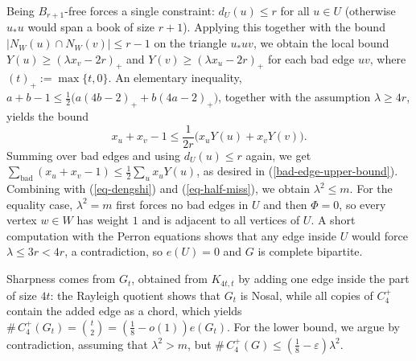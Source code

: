 \documentclass[10pt,a4paper]{amsart}
\renewcommand{\le}{\leqslant}
\renewcommand{\ge}{\geqslant}
\begin{document}
\smallskip
\noindent
{}
Being $B_{r+1}$-free forces a single constraint:  $d_U(u)\le r$ for all $u\in U$
(otherwise $u_*u$ would span a book of size $r+1$). Applying this together with the bound
$|N_W(u)\cap N_W(v)|\le r-1$ on the triangle $u_*uv$, we obtain the local 
bound $Y(u)\ge(\lambda x_v-2r)_+$ and 
$ Y(v)\ge (\lambda x_u -2r)_+$ for each bad edge $uv$, where  $(t)_+:=\max\{t,0\}$. 
An elementary inequality, 
$a+b-1\le\tfrac12\bigl(a(4b-2)_++b(4a-2)_+\bigr)$, together with the assumption $\lambda\ge 4r$,  yields the  bound
$$ x_u+x_v-1\le\frac1{2r}\bigl(x_uY(u)+x_vY(v)\bigr). $$  Summing over bad edges and
using $d_U (u)\le r$ again, we get 
$\sum_{\text{bad}} (x_u+x_v -1) \le  \tfrac12\sum_{u}x_uY(u)$, as desired in (\ref{bad-edge-upper-bound}). Combining with (\ref{eq-dengshi}) and (\ref{eq-half-miss}), 
we obtain $\lambda ^2\le m$. For the equality case, $\lambda^2=m$ first forces no bad edges in $U$ and then $\Phi=0$, so every vertex $w\in W$ has weight $1$ and
is adjacent to all vertices of $U$. A short computation with the Perron equations shows that any
edge inside $U$ would force $\lambda\le 3r<4r$, a contradiction, so $e(U)=0$ and
$G$ is complete bipartite.

\smallskip
\noindent
{}
Sharpness comes from $G_t$, obtained from $K_{4t,t}$ by adding one
edge inside the part of size $4t$: the Rayleigh quotient shows that $G_t$ is Nosal, while all copies of $C_4^+$ contain the added edge as a chord, which yields 
$\texttt{\#}\,C_4^+(G_t)=\binom t2=(\tfrac18-o(1))e(G_t)$. For the lower bound, we argue by
contradiction, assuming that $\lambda^2>m$, but 
$\texttt{\#}\, C_4^+(G)\le(\tfrac18-\varepsilon)\lambda^2$. 
\end{document}
